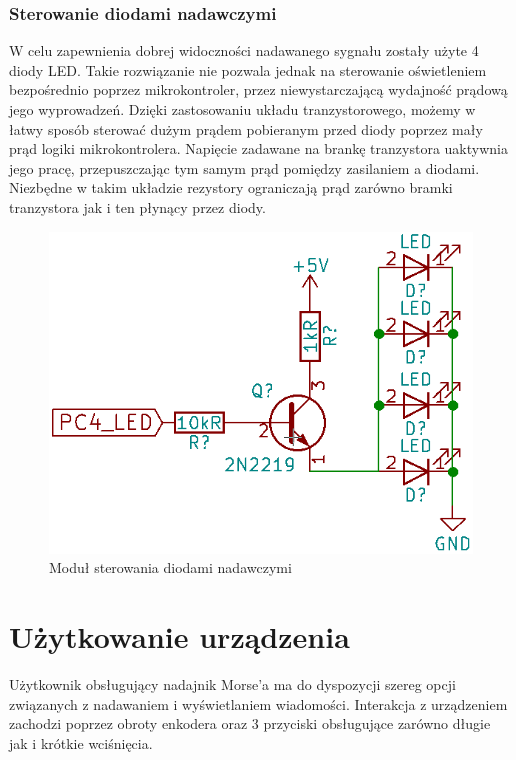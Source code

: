 \documentclass{article}
\begin{document}
\newpage
\subsubsection{Sterowanie diodami nadawczymi}
W celu zapewnienia dobrej widoczności nadawanego sygnału zostały użyte 4 diody LED. Takie rozwiązanie nie pozwala jednak na sterowanie oświetleniem bezpośrednio poprzez mikrokontroler, przez niewystarczającą wydajność prądową jego wyprowadzeń. Dzięki zastosowaniu układu tranzystorowego, możemy w łatwy sposób sterować dużym prądem pobieranym przed diody poprzez mały prąd logiki mikrokontrolera. Napięcie zadawane na brankę tranzystora uaktywnia jego pracę, przepuszczając tym samym prąd pomiędzy zasilaniem a diodami. Niezbędne w takim układzie rezystory ograniczają prąd zarówno bramki tranzystora jak i ten płynący przez diody. 

\begin{figure}[h!]
	\center
	\includegraphics[scale=0.3]{img/sterowanie_diodami.png}
	\caption{Moduł sterowania diodami nadawczymi}
	\label{fig:zdjecie1}
\end{figure}

\section{Użytkowanie urządzenia}
Użytkownik obsługujący nadajnik Morse'a ma do dyspozycji szereg opcji związanych z nadawaniem i wyświetlaniem wiadomości. Interakcja z urządzeniem zachodzi poprzez obroty enkodera oraz 3 przyciski obsługujące zarówno długie jak i krótkie wciśnięcia.
\end{document}
